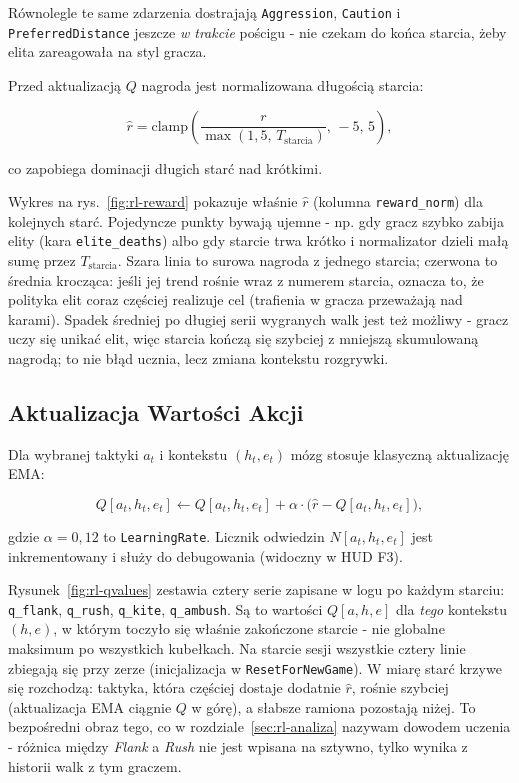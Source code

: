 Równolegle te same zdarzenia dostrajają \texttt{Aggression}, \texttt{Caution} i \texttt{PreferredDistance} jeszcze \emph{w trakcie} pościgu - nie czekam do końca starcia, żeby elita zareagowała na styl gracza.

Przed aktualizacją $Q$ nagroda jest normalizowana długością starcia:

\[
    \hat r = \text{clamp}\!\left(\frac{r}{\max(1{,}5,\, T_\text{starcia})},\, -5,\, 5\right),
\]

co zapobiega dominacji długich starć nad krótkimi.

Wykres na rys.~\ref{fig:rl-reward} pokazuje właśnie $\hat r$ (kolumna \texttt{reward\_norm}) dla kolejnych starć. Pojedyncze punkty bywają ujemne - np. gdy gracz szybko zabija elity (kara \texttt{elite\_deaths}) albo gdy starcie trwa krótko i normalizator dzieli małą sumę przez $T_\text{starcia}$. Szara linia to surowa nagroda z jednego starcia; czerwona to średnia krocząca: jeśli jej trend rośnie wraz z numerem starcia, oznacza to, że polityka elit coraz częściej realizuje cel (trafienia w gracza przeważają nad karami). Spadek średniej po długiej serii wygranych walk jest też możliwy - gracz uczy się unikać elit, więc starcia kończą się szybciej z mniejszą skumulowaną nagrodą; to nie błąd ucznia, lecz zmiana kontekstu rozgrywki.


\subsection{Aktualizacja Wartości Akcji}

Dla wybranej taktyki $a_t$ i kontekstu $(h_t, e_t)$ mózg stosuje klasyczną aktualizację EMA:

\[
    Q[a_t, h_t, e_t] \leftarrow Q[a_t, h_t, e_t] + \alpha \cdot \bigl(\hat r - Q[a_t, h_t, e_t]\bigr),
\]

gdzie $\alpha = 0{,}12$ to \texttt{LearningRate}. Licznik odwiedzin $N[a_t, h_t, e_t]$ jest inkrementowany i służy do debugowania (widoczny w HUD F3).

Rysunek~\ref{fig:rl-qvalues} zestawia cztery serie zapisane w logu po każdym starciu: \texttt{q\_flank}, \texttt{q\_rush}, \texttt{q\_kite}, \texttt{q\_ambush}. Są to wartości $Q[a, h, e]$ dla \emph{tego} kontekstu $(h,e)$, w którym toczyło się właśnie zakończone starcie - nie globalne maksimum po wszystkich kubełkach. Na starcie sesji wszystkie cztery linie zbiegają się przy zerze (inicjalizacja w \texttt{ResetForNewGame}). W miarę starć krzywe się rozchodzą: taktyka, która częściej dostaje dodatnie $\hat r$, rośnie szybciej (aktualizacja EMA ciągnie $Q$ w górę), a słabsze ramiona pozostają niżej. To bezpośredni obraz tego, co w rozdziale~\ref{sec:rl-analiza} nazywam dowodem uczenia - różnica między \textit{Flank} a \textit{Rush} nie jest wpisana na sztywno, tylko wynika z historii walk z tym graczem.


